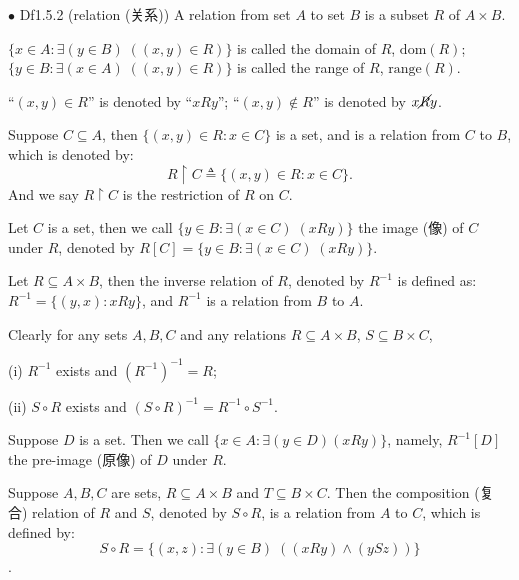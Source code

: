 \documentclass{article}
\begin{document}
\begin{Df}{$\bullet$ Df1.5.2 (relation (关系))}
    A relation from set $A$ to set $B$ is a subset $R$ of $A\times B$.
\end{Df}
\begin{compactitem}
    \item \textcolor{Df}{$\{x\in A: \exists (y\in B)\;((x,y)\in R)\}$ is called the domain of $R$, $\text{dom}(R)$; $\{y\in B: \exists (x\in A)\;((x,y)\in R)\}$ is called the range of $R$, $\text{range}(R)$.}
    \item \textcolor{Df}{``$(x,y)\in R$'' is denoted by ``$xRy$''; ``$(x,y)\notin R$'' is denoted by $x\cancel{R} y$.}
    \item \textcolor{Df}{Suppose $C\subseteq A$, then $\{(x,y)\in R: x\in C\}$ is a set, and is a relation from $C$ to $B$, which is denoted by: $$R\upharpoonright C \triangleq \{(x,y)\in R: x\in C\}.$$ And we say $R\upharpoonright C$ is the restriction of $R$ on $C$.} 
    \item \textcolor{Df}{Let $C$ is a set, then we call $\{y\in B: \exists (x\in C)\;(xRy)\}$ the image (像) of $C$ under $R$, denoted by $R[C] = \{y\in B: \exists (x\in C)\;(xRy)\}$.}
    \item \textcolor{Df}{Let $R\subseteq A\times B$, then the inverse relation of $R$, denoted by $R^{-1}$ is defined as: $R^{-1} = \{(y,x): xRy\}$, and $R^{-1}$ is a relation from $B$ to $A$.}
    \item \textcolor{Th}{Clearly for any sets $A, B, C$ and any relations $R\subseteq A\times B$, $S\subseteq B\times C$, 
    \begin{compactenum}
        \item[(i)] $R^{-1}$ exists and $(R^{-1})^{-1} = R$;
        \item[(ii)] $S\circ R$ exists and $(S\circ R)^{-1} = R^{-1}\circ S^{-1}$. 
    \end{compactenum}
    }
    \item \textcolor{Df}{Suppose $D$ is a set. Then we call $\{x\in A: \exists (y\in D) (xRy)\}$, namely, $R^{-1}[D]$ the pre-image (原像) of $D$ under $R$.}
    \item \textcolor{Df}{Suppose $A,B,C$ are sets, $R\subseteq A\times B$ and $T\subseteq B\times C$. Then the composition (复合) relation of $R$ and $S$, denoted by $S\circ R$, is a relation from $A$ to $C$, which is defined by:$$S\circ R = \{(x,z): \exists (y\in B)\; ((xRy)\land (ySz))\}$$.}
\end{compactitem}
\end{document}
